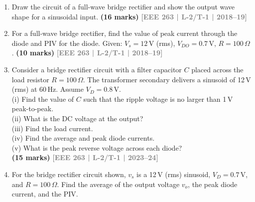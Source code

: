 \documentclass[12pt,a4paper]{article}
\newcommand{\yr}[1]{\hfill\textcolor{gray}{\small\textbf{[#1]}}}
\newcommand{\mk}[1]{\textcolor{orange!70!black}{\small\textbf{(#1 marks)}}}
\begin{document}
\begin{enumerate}
\begin{center}

\end{center}
\mk{23} \yr{EEE 263 | L-2/T-1 | 2020--21}

\item Draw the circuit of a full-wave bridge rectifier and show the output wave shape for a sinusoidal input.
\mk{16} \yr{EEE 263 | L-2/T-1 | 2018--19}

\item For a full-wave bridge rectifier, find the value of peak current through the diode and PIV for the diode. Given: $V_s=12\,\text{V}$ (rms), $V_{DO}=0.7\,\text{V}$, $R=100\,\Omega$.
\mk{10} \yr{EEE 263 | L-2/T-1 | 2018--19}

\item Consider a bridge rectifier circuit with a filter capacitor $C$ placed across the load resistor $R=100\,\Omega$. The transformer secondary delivers a sinusoid of 12\,V (rms) at 60\,Hz. Assume $V_D=0.8\,\text{V}$.\\
 (i) Find the value of $C$ such that the ripple voltage is no larger than 1\,V peak-to-peak. \\
 (ii) What is the DC voltage at the output? \\
 (iii) Find the load current. \\
 (iv) Find the average and peak diode currents. \\
 (v) What is the peak reverse voltage across each diode?\\
\mk{15} \yr{EEE 263 | L-2/T-1 | 2023--24}

\item For the bridge rectifier circuit shown, $v_s$ is a 12\,V (rms) sinusoid, $V_D=0.7\,\text{V}$, and $R=100\,\Omega$. Find the average of the output voltage $v_o$, the peak diode current, and the PIV.
\begin{center}
    

\end{center}
\end{enumerate}
\end{document}
